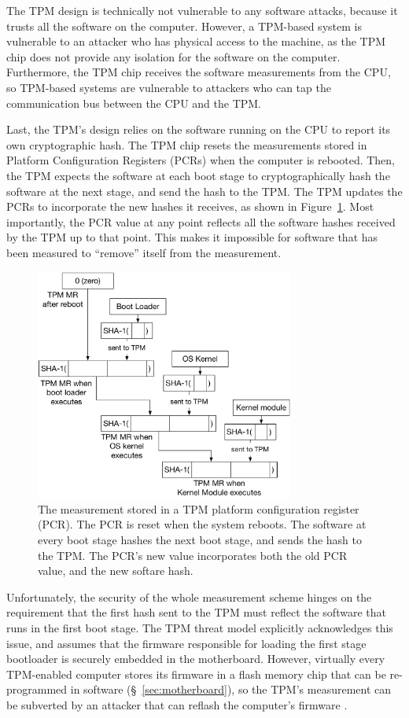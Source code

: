 The TPM design is technically not vulnerable to any software attacks, because
it trusts all the software on the computer. However, a TPM-based system is
vulnerable to an attacker who has physical access to the machine, as the TPM
chip does not provide any isolation for the software on the computer.
Furthermore, the TPM chip receives the software measurements from the CPU,
so TPM-based systems are vulnerable to attackers who can tap the communication
bus between the CPU and the TPM.

Last, the TPM's design relies on the software running on the CPU to report its
own cryptographic hash. The TPM chip resets the measurements stored in Platform
Configuration Registers (PCRs) when the computer is rebooted. Then, the TPM
expects the software at each boot stage to cryptographically hash the software
at the next stage, and send the hash to the TPM. The TPM updates the PCRs to
incorporate the new hashes it receives, as shown in
Figure~\ref{fig:tpm_measurement}. Most importantly, the PCR value at any point
reflects all the software hashes received by the TPM up to that point. This
makes it impossible for software that has been measured to ``remove'' itself
from the measurement.

\begin{figure}[hbt]
  \centering
  \includegraphics[width=85mm]{figures/tpm_measurement.pdf}
  \caption{
    The measurement stored in a TPM platform configuration register (PCR). The
    PCR is reset when the system reboots. The software at every boot stage
    hashes the next boot stage, and sends the hash to the TPM. The PCR's new
    value incorporates both the old PCR value, and the new softare hash.
  }
  \label{fig:tpm_measurement}
\end{figure}

Unfortunately, the security of the whole measurement scheme hinges on the
requirement that the first hash sent to the TPM must reflect the software that
runs in the first boot stage. The TPM threat model explicitly acknowledges this
issue, and assumes that the firmware responsible for loading the first stage
bootloader is securely embedded in the motherboard. However, virtually every
TPM-enabled computer stores its firmware in a flash memory chip that can be
re-programmed in software (\S~\ref{sec:motherboard}), so the TPM's measurement
can be subverted by an attacker that can reflash the computer's firmware
\cite{butterworth2013bios}.

